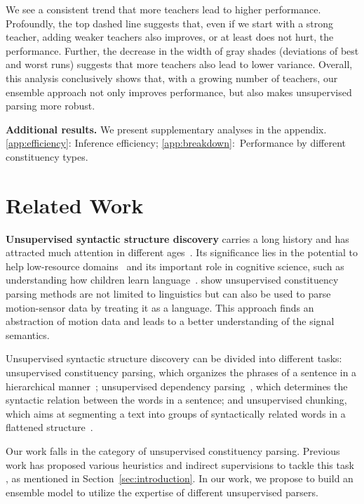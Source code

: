 \documentclass{article}
\begin{document}
We see a consistent trend that more teachers lead to higher performance. Profoundly, the top dashed line suggests that, even if we start with a strong teacher, adding weaker teachers also improves, or at least does not hurt, the performance. Further, the decrease in the width of gray shades (deviations of best and worst runs) suggests that more teachers also lead to lower variance. Overall, this analysis conclusively shows that, with a growing number of teachers, our ensemble approach not only improves performance, but also makes unsupervised parsing more robust.

\textbf{Additional results.} We present supplementary analyses in the appendix. \ref{app:efficiency}: Inference efficiency; \ref{app:breakdown}:~Performance by different constituency types.


\section{Related Work}
\textbf{Unsupervised syntactic structure discovery} carries a long history and has attracted much attention in different ages~\citep{klein2005unsupervised,shen2018ordered,li-lu-2023-contextual}. Its significance lies in the potential to help low-resource domains~\citep{kann-etal-2019-neural} and its important role in cognitive science, such as understanding how children learn language~\citep{Exemplar2Grammar}.
\citet{6137337} show unsupervised constituency parsing methods are not limited to linguistics but can also be used to parse motion-sensor data by treating it as a language. This approach finds an abstraction of motion data and leads to a better understanding of the signal semantics.

Unsupervised syntactic structure discovery can be divided into different tasks: unsupervised constituency parsing, which  organizes the phrases of a sentence in a hierarchical manner~\citep{constituencyTree}; unsupervised dependency parsing~\citep{nivre2010dependency, naseem2010using, han-etal-2020-survey}, which determines the syntactic relation between the words in a sentence; and 
unsupervised chunking, which aims at segmenting a text into groups of syntactically related words in a flattened structure~\citep{deshmukh-etal-2021-unsupervised-chunking, wu2023unsupervised}.

Our work falls in the category of unsupervised constituency parsing. Previous work has proposed various heuristics and indirect supervisions to tackle this task \citep{snyder2009unsupervised,kim-etal-2019-compound,drozdov-etal-2019-unsupervised-latent}, as mentioned in Section~\ref{sec:introduction}.
In our work, we propose to build an ensemble model to utilize the expertise of different unsupervised parsers.
\end{document}
